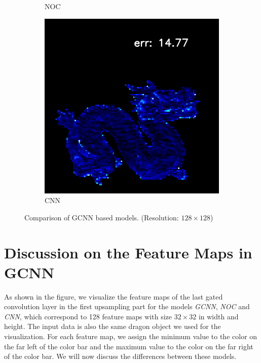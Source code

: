 \begin{figure}[H]
\begin{subfigure}[b]{0.24\linewidth}
		\caption{NOC}
	\end{subfigure}
	\begin{subfigure}[b]{0.24\linewidth}
		\includegraphics[width=\linewidth]{./Figures/gcnn_synthetic/fancy_eval_7_error_GCNN-CNN.png}
		\caption{CNN}
	\end{subfigure}
	\decoRule
	\caption{Comparison of GCNN based models. (Resolution: $ 128\times 128 $)}
	\label{fig:gcnn-eval-multi-model}
\end{figure}


\section{Discussion on the Feature Maps in GCNN}

As shown in the figure, we visualize the feature maps of the last gated convolution layer in the first upsampling part for the models \textit{GCNN}, \textit{NOC} and \textit{CNN}, which correspond to 128 feature maps with size $ 32\times 32 $ in width and height. 
The input data is also the same dragon object we used for the visualization. For each feature map, we assign the minimum value to the color on the far left of the color bar and the maximum value to the color on the far right of the color bar. 
We will now discuss the differences between these models.

